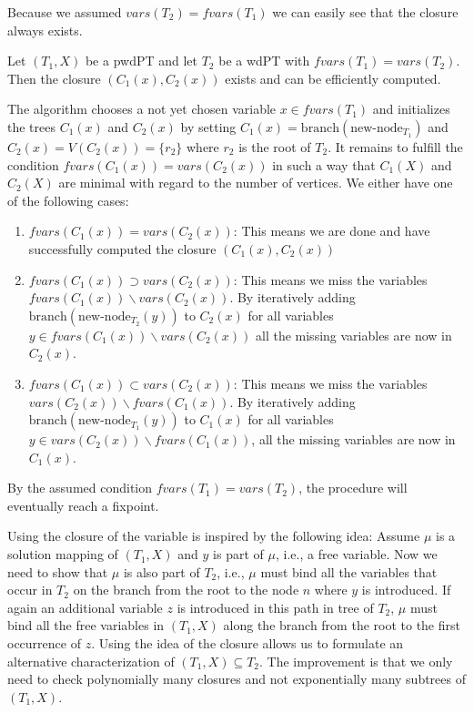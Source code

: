 Because we assumed $vars(T_2) = fvars(T_1)$ we can easily see that the closure
always exists. 

\begin{proposition}
	Let $(T_1,X)$ be a pwdPT and let $T_2$ be a wdPT with $fvars(T_1) =
	vars(T_2)$. Then the closure $(C_1(x),C_2(x))$ exists and can be
	efficiently computed.
\end{proposition}
\begin{proofidea}
	The algorithm chooses a not yet chosen variable $x \in fvars(T_1)$ and
	initializes the trees $C_1(x)$ and $C_2(x)$ by setting $C_1(x) =
	\mbox{branch}(\mbox{new-node}_{T_1})$ and $C_2(x) = V(C_2(x)) = \{r_2\}$ where $r_2$ is
	the root of $T_2$. It remains to fulfill the condition $fvars(C_1(x)) =
	vars(C_2(x))$ in such a way that $C_1(X)$ and $C_2(X)$ are minimal with
	regard to the number of vertices. We either have one of the following cases:
	\begin{enumerate}
		\item $fvars(C_1(x)) = vars(C_2(x))$: This means we are done and have
			successfully computed the closure $(C_1(x), C_2(x))$
		\item $fvars(C_1(x)) \supset vars(C_2(x))$: This means we miss the
			variables\\ $fvars(C_1(x)) \backslash vars(C_2(x))$. By
			iteratively adding $\mbox{branch}(\mbox{new-node}_{T_2}(y))$ to $C_2(x)$ for all
			variables\\ $y \in fvars(C_1(x)) \backslash vars(C_2(x))$ all
			the missing variables are now in $C_2(x)$.
		\item $fvars(C_1(x)) \subset vars(C_2(x))$: This means we miss the
			variables\\ $vars(C_2(x)) \backslash fvars(C_1(x))$. By iteratively
			adding $\mbox{branch}(\mbox{new-node}_{T_1}(y))$ to $C_1(x)$ for all variables
			$y \in vars(C_2(x)) \backslash fvars(C_1(x))$, all the missing
			variables are now in $C_1(x)$.
	\end{enumerate}
	By the assumed condition $fvars(T_1) = vars(T_2)$, the procedure will
	eventually reach a fixpoint.
\end{proofidea}

Using the closure of the variable is inspired by the following idea:
Assume $\mu$ is a solution mapping of $(T_1,X)$ and $y$ is part of $\mu$, i.e.,
a free variable. Now we need to show that $\mu$ is also part of $T_2$, i.e.,
$\mu$ must bind all the variables that occur in $T_2$ on the branch from the
root to the node $n$ where $y$ is introduced. If again an additional variable
$z$ is introduced in this path in tree of $T_2$, $\mu$ must bind all the free
variables in $(T_1,X)$ along the branch from the root to the first occurrence of
$z$. Using the idea of the closure allows us to formulate an alternative characterization of
$(T_1,X) \subseteq T_2$. The improvement is that we only need to check
polynomially many closures and not exponentially many subtrees of $(T_1,X)$.

